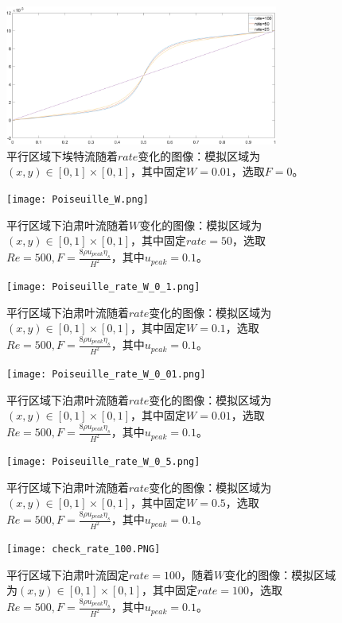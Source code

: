 \documentclass[11pt,UTF8]{ctexart}
\begin{document}
    \begin{figure}[h]
        \centerline{\includegraphics[width=0.8\textwidth]{Parall_C_rate/untitled.png}}
        \caption{平行区域下埃特流随着$rate$变化的图像：模拟区域为$(x,y)\in [0,1]\times [0,1]$，其中固定$W=0.01$，选取$F=0$。}
        \label{img3}
    \end{figure}
    \begin{figure}[p]
        \centerline{\texttt{[image: Poiseuille\_W.png]}}
        \caption{平行区域下泊肃叶流随着$W$变化的图像：模拟区域为$(x,y)\in [0,1]\times [0,1]$，其中固定$rate=50$，选取$Re=500,F=\frac{8\rho u_{peak} \eta_s}{H^2}$，其中$u_{peak}=0.1$。}
        \label{img4}
    \end{figure}
    \begin{figure}[h]
        \centerline{\texttt{[image: Poiseuille\_rate\_W\_0\_1.png]}}
        \caption{平行区域下泊肃叶流随着$rate$变化的图像：模拟区域为$(x,y)\in [0,1]\times [0,1]$，其中固定$W=0.1$，选取$Re=500,F=\frac{8\rho u_{peak} \eta_s}{H^2}$，其中$u_{peak}=0.1$。}
        \label{img5}
    \end{figure}
    \begin{figure}[h]
        \centerline{\texttt{[image: Poiseuille\_rate\_W\_0\_01.png]}}
        \caption{平行区域下泊肃叶流随着$rate$变化的图像：模拟区域为$(x,y)\in [0,1]\times [0,1]$，其中固定$W=0.01$，选取$Re=500,F=\frac{8\rho u_{peak} \eta_s}{H^2}$，其中$u_{peak}=0.1$。}
        \label{img6}
    \end{figure}
    \begin{figure}[h]
        \centerline{\texttt{[image: Poiseuille\_rate\_W\_0\_5.png]}}
        \caption{平行区域下泊肃叶流随着$rate$变化的图像：模拟区域为$(x,y)\in [0,1]\times [0,1]$，其中固定$W=0.5$，选取$Re=500,F=\frac{8\rho u_{peak} \eta_s}{H^2}$，其中$u_{peak}=0.1$。}
        \label{img7}
    \end{figure}
    \begin{figure}[h]
        \centerline{\texttt{[image: check\_rate\_100.PNG]}}
        \caption{平行区域下泊肃叶流固定$rate=100$，随着$W$变化的图像：模拟区域为$(x,y)\in [0,1]\times [0,1]$，其中固定$rate=100$，选取$Re=500,F=\frac{8\rho u_{peak} \eta_s}{H^2}$，其中$u_{peak}=0.1$。}
        \label{img27}
    \end{figure}
\end{document}

